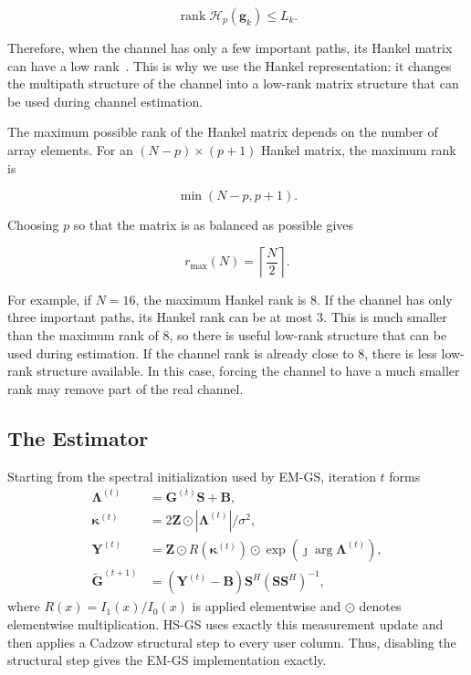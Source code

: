 \documentclass[journal]{IEEEtran}
\DeclareMathOperator{\rank}{rank}
\newcommand{\bG}{\mathbf{G}}
\newcommand{\bS}{\mathbf{S}}
\newcommand{\bB}{\mathbf{B}}
\newcommand{\bZ}{\mathbf{Z}}
\newcommand{\bY}{\mathbf{Y}}
\newcommand{\bg}{\mathbf{g}}
\newcommand{\Hank}{\mathcal{H}}
\newcommand{\rmax}{r_{\max}}
\begin{document}
\begin{equation}
\rank\Hank_p(\bg_k)
\leq
L_k.
\end{equation}

Therefore, when the channel has only a few important paths, its Hankel
matrix can have a low rank~\cite{cadzow1988,markovsky2008}. This is why we
use the Hankel representation: it changes the multipath structure of the
channel into a low-rank matrix structure that can be used during channel
estimation.

The maximum possible rank of the Hankel matrix depends on the number of
array elements. For an $(N-p)\times(p+1)$ Hankel matrix, the maximum rank is

\begin{equation}
\min(N-p,p+1).
\end{equation}

Choosing $p$ so that the matrix is as balanced as possible gives

\begin{equation}
\rmax(N)
=
\left\lceil
\frac{N}{2}
\right\rceil.
\label{eq:cap}
\end{equation}

For example, if $N=16$, the maximum Hankel rank is $8$. If the channel
has only three important paths, its Hankel rank can be at most $3$.
This is much smaller than the maximum rank of $8$, so there is useful
low-rank structure that can be used during estimation. If the channel
rank is already close to $8$, there is less low-rank structure available.
In this case, forcing the channel to have a much smaller rank may remove
part of the real channel.

\subsection{The Estimator}

Starting from the spectral initialization used by EM-GS, iteration $t$ forms
\begin{align}
\boldsymbol\Lambda^{(t)}&=\bG^{(t)}\bS+\bB,\\
\boldsymbol{\kappa}^{(t)}&=2\bZ\odot|\boldsymbol\Lambda^{(t)}|/\sigma^2,\\
\bY^{(t)}&=\bZ\odot R(\boldsymbol{\kappa}^{(t)})
 \odot\exp\!\left(\jmath\arg\boldsymbol\Lambda^{(t)}\right),\\
\widetilde{\bG}^{(t+1)}&=(\bY^{(t)}-\bB)\bS^H
 (\bS\bS^H)^{-1},
\end{align}
where $R(x)=I_1(x)/I_0(x)$ is applied elementwise and $\odot$ denotes
elementwise multiplication. HS-GS uses exactly this measurement update and
then applies a Cadzow structural step to every user column. Thus, disabling
the structural step gives the EM-GS implementation exactly.
\end{document}

